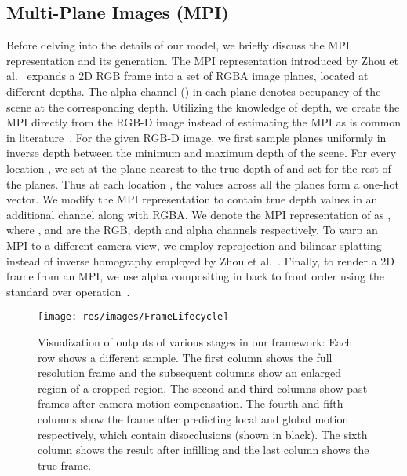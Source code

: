 \documentclass[preprint]{vgtc}
\def\etal{et al.}
\begin{document}
    \subsection{Multi-Plane Images (MPI)}\label{subsec:mpi}
    Before delving into the details of our model, we briefly discuss the MPI representation and its generation.
    The MPI representation introduced by Zhou \etal~\cite{zhou2018stereomag} expands a 2D RGB frame into a set of RGBA image planes, located at different depths.
    The alpha channel () in each plane denotes occupancy of the scene at the corresponding depth.
    Utilizing the knowledge of depth, we create the MPI directly from the RGB-D image instead of estimating the MPI as is common in literature~\cite{zhou2018stereomag,tucker2020single,li2021mine}.
    For the given RGB-D image, we first sample  planes uniformly in inverse depth between the minimum and maximum depth of the scene.
    For every location , we set  at the plane nearest to the true depth of  and set  for the rest of the planes.
    Thus at each location , the  values across all the planes form a one-hot vector.
    We modify the MPI representation to contain true depth values in an additional channel along with RGBA\@.
    We denote the MPI representation of  as , where ,  and  are the RGB, depth and alpha channels respectively.
    To warp an MPI to a different camera view, we employ reprojection and bilinear splatting~\cite{tulsiani2018layer,kanchana2022ivp} instead of inverse homography employed by Zhou \etal~\cite{zhou2018stereomag}.
    Finally, to render a 2D frame from an MPI, we use alpha compositing in back to front order using the standard over operation~\cite{zhou2018stereomag}.

    \begin{figure*}
        \centering
        \texttt{[image: res/images/FrameLifecycle]}
        \caption{Visualization of outputs of various stages in our framework: Each row shows a different sample.
        The first column shows the full resolution frame and the subsequent columns show an enlarged region of a cropped region.
        The second and third columns show past frames after camera motion compensation.
        The fourth and fifth columns show the frame after predicting local and global motion respectively, which contain disocclusions (shown in black).
        The sixth column shows the result after infilling and the last column shows the true frame.
        }
        \label{fig:frame-lifecycle}
    \end{figure*}
\end{document}
